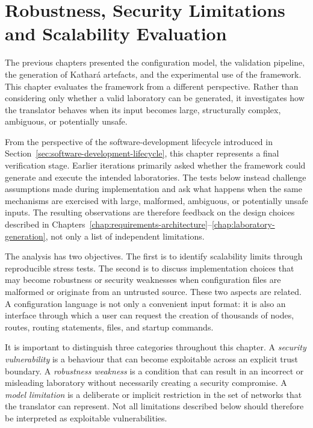 \chapter{Robustness, Security Limitations and Scalability Evaluation}
\label{chap:robustness-security-scalability}

The previous chapters presented the configuration model, the validation
pipeline, the generation of Kathar\'a artefacts, and the experimental use of
the framework. This chapter evaluates the framework from a different
perspective. Rather than considering only whether a valid laboratory can be
generated, it investigates how the translator behaves when its input becomes
large, structurally complex, ambiguous, or potentially unsafe.

From the perspective of the software-development lifecycle introduced in
Section~\ref{sec:software-development-lifecycle}, this chapter represents a
final verification stage. Earlier iterations primarily asked whether the
framework could generate and execute the intended laboratories. The tests below
instead challenge assumptions made during implementation and ask what happens
when the same mechanisms are exercised with large, malformed, ambiguous, or
potentially unsafe inputs. The resulting observations are therefore feedback on
the design choices described in Chapters~\ref{chap:requirements-architecture}--\ref{chap:laboratory-generation}, not only a list of independent limitations.

The analysis has two objectives. The first is to identify scalability limits
through reproducible stress tests. The second is to discuss implementation
choices that may become robustness or security weaknesses when configuration
files are malformed or originate from an untrusted source. These two aspects
are related. A configuration language is not only a convenient input format:
it is also an interface through which a user can request the creation of
thousands of nodes, routes, routing statements, files, and startup commands.

It is important to distinguish three categories throughout this chapter.
A \emph{security vulnerability} is a behaviour that can become exploitable
across an explicit trust boundary. A \emph{robustness weakness} is a condition
that can result in an incorrect or misleading laboratory without necessarily
creating a security compromise. A \emph{model limitation} is a deliberate or
implicit restriction in the set of networks that the translator can
represent. Not all limitations described below should therefore be interpreted
as exploitable vulnerabilities.

